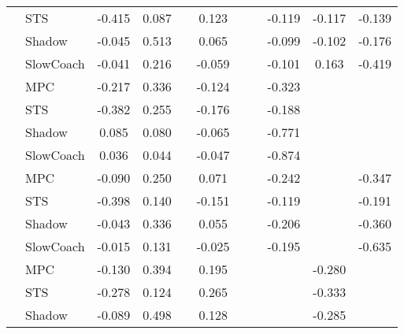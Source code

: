 \begin{tabular}{|l|l|*{9}{c|}}
                                                           & STS &   -0.415 &     0.087 &        &  0.123 &     &     &  -0.119 &  -0.117 &   -0.139 \\
                                                           & Shadow &   -0.045 &     0.513 &        &  0.065 &     &     &  -0.099 &  -0.102 &   -0.176 \\
                                                           & SlowCoach &   -0.041 &     0.216 &        & -0.059 &     &     &  -0.101 &   0.163 &   -0.419 \\
\midrule
[True, True, False, True, False, False, True, False, False] & MPC &   -0.217 &     0.336 &        & -0.124 &     &     &  -0.323 &      &       \\
                                                           & STS &   -0.382 &     0.255 &        & -0.176 &     &     &  -0.188 &      &       \\
                                                           & Shadow &    0.085 &     0.080 &        & -0.065 &     &     &  -0.771 &      &       \\
                                                           & SlowCoach &    0.036 &     0.044 &        & -0.047 &     &     &  -0.874 &      &       \\
\midrule
[True, True, False, True, False, False, True, False, True] & MPC &   -0.090 &     0.250 &        &  0.071 &     &     &  -0.242 &      &   -0.347 \\
                                                           & STS &   -0.398 &     0.140 &        & -0.151 &     &     &  -0.119 &      &   -0.191 \\
                                                           & Shadow &   -0.043 &     0.336 &        &  0.055 &     &     &  -0.206 &      &   -0.360 \\
                                                           & SlowCoach &   -0.015 &     0.131 &        & -0.025 &     &     &  -0.195 &      &   -0.635 \\
\midrule
[True, True, False, True, False, False, False, True, False] & MPC &   -0.130 &     0.394 &        &  0.195 &     &     &      &  -0.280 &       \\
                                                           & STS &   -0.278 &     0.124 &        &  0.265 &     &     &      &  -0.333 &       \\
                                                           & Shadow &   -0.089 &     0.498 &        &  0.128 &     &     &      &  -0.285 &       \\

\end{tabular}
